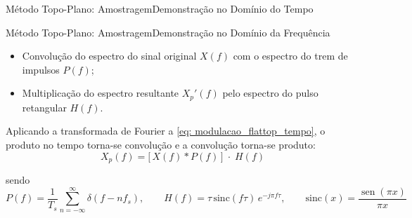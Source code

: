 \begin{frame}{Método Topo-Plano: Amostragem}{Demonstração no Domínio do Tempo}
\begin{center}
  \end{center}
\end{frame}

\begin{frame}{Método Topo-Plano: Amostragem}{Demonstração no Domínio da Frequência}

  \begin{itemize}
    \item Convolução do espectro do sinal original $X(f)$ com o espectro
          do trem de impulsos $P(f)$;
    \item Multiplicação do espectro resultante $X_p'(f)$ pelo espectro do
          pulso retangular $H(f)$.
  \end{itemize}

  \vspace{0.4em}
  Aplicando a transformada de Fourier a \eqref{eq: modulacao_flattop_tempo}, o
  produto no tempo torna-se convolução e a convolução torna-se produto:
  \begin{equation}
    X_p(f) = \Big[\, X(f) * P(f) \,\Big] \;\cdot\; H(f)
    \label{eq: modulacao_flattop_freq}
  \end{equation}

  \vspace{0.1em}
  sendo
  \begin{equation*}
    P(f) = \frac{1}{T_s}\sum_{n=-\infty}^{\infty}\delta(f - nf_s),
    \qquad
    H(f) = \tau\,\mathrm{sinc}(f\tau)\,e^{-j\pi f\tau},
    \qquad
    \mathrm{sinc}(x) = \frac{\operatorname{sen}(\pi x)}{\pi x}
  \end{equation*}

\end{frame}

